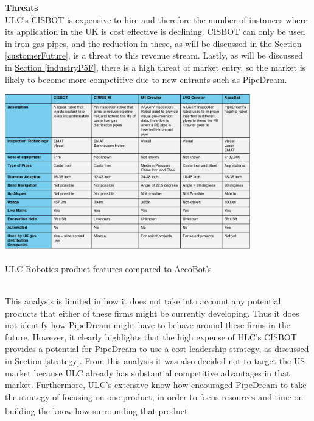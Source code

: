 \documentclass[11pt]{article}		%
\newcommand{\supercite}[1]{\textsuperscript{\cite{#1}}}		%
\newcommand{\sectref}[1]{\hyperref[#1]{Section \ref*{#1}}}     %
\begin{document}
	        \textbf{Threats}
	        \\
	        ULC's CISBOT is expensive to hire and therefore the number of instances where its application in the UK is cost effective is declining. CISBOT can only be used in iron gas pipes, and the reduction in these, as will be discussed in the \sectref{customerFuture}, is a threat to this revenue stream. Lastly, as will be discussed in \sectref{industryP5F}, there is a high threat of market entry, so the market is likely to become more competitive due to new entrants such as PipeDream.
            \begin{table}[h]
				\centering
				\includegraphics[width=0.8\textwidth]{ULC_robot_comparison_formatted}
				\caption{ULC Robotics product features compared to AccoBot's\supercite{ULC_Robots}}
				\label{ULCFeatures}
			\end{table}
			\\
            \hspace*{2ex}This analysis is limited in how it does not take into account any potential products that either of these firms might be currently developing. Thus it does not identify how PipeDream might have to behave around these firms in the future. However, it clearly highlights that the high expense of ULC's CISBOT provides a potential for PipeDream to use a cost leadership strategy, as discussed in \sectref{strategy}. From this analysis it was also decided not to target the US market because ULC already has substantial competitive advantages in that market. Furthermore, ULC's extensive know how encouraged PipeDream to take the strategy of focusing on one product, in order to focus resources and time on building the know-how surrounding that product\supercite{Barney}. %
\end{document}
